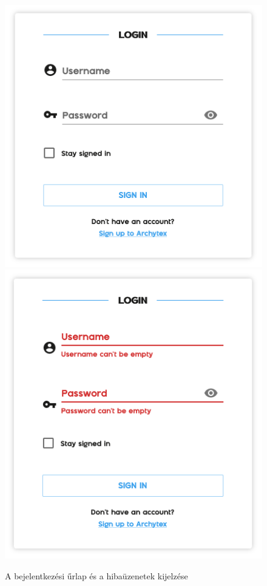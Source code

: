 \begin{figure}[h]
  \centering
  \includegraphics[scale=.6]{parts/user-documentation/account/images/login.png}
  \includegraphics[scale=.6]{parts/user-documentation/account/images/login-errors.png}
  \caption{A bejelentkezési űrlap és a hibaüzenetek kijelzése}
\end{figure}

